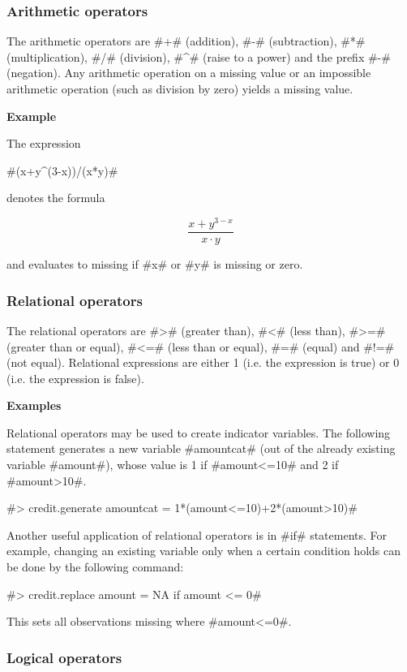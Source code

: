 \subsubsection{Arithmetic operators}

The arithmetic operators are #+# (addition), #-# (subtraction),
#*# (multiplication), #/# (division), #^# (raise to a power) and
the prefix #-# (negation). Any arithmetic operation on a missing
value or an impossible arithmetic operation (such as division by zero) yields a missing value.

{\bf Example}

The expression

#(x+y^(3-x))/(x*y)#

denotes the formula

$$
\frac{x+y^{3-x}}{x\cdot y}
$$

and evaluates to missing if #x# or #y# is missing or zero.


\subsubsection{Relational operators}

The relational operators are #># (greater than), #<# (less than),
#>=# (greater than or equal), #<=# (less than or equal), #=#
(equal) and #!=# (not equal). Relational expressions are either
1 (i.e. the expression is true) or 0 (i.e. the expression is false).



{\bf Examples}

Relational operators may be used to create indicator variables.
The following statement generates a new variable #amountcat# (out
of the already existing variable #amount#), whose
value is 1 if #amount<=10# and 2 if #amount>10#.

#> credit.generate amountcat = 1*(amount<=10)+2*(amount>10)#

Another useful application of relational operators is in #if#
statements. For example, changing
an existing variable only when a certain condition holds can be done by the following command:

#> credit.replace amount = NA if amount <= 0#

This sets all observations missing where #amount<=0#.

\subsubsection{Logical operators}

